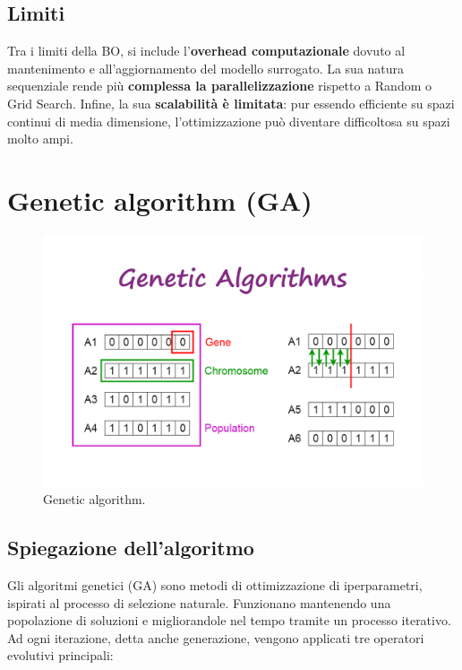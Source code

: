 \documentclass[a4paper,12pt]{report}
\begin{document}
	\subsection{Limiti}
	Tra i limiti della BO, si include l'\textbf{overhead computazionale} dovuto al mantenimento e all'aggiornamento del modello surrogato. La sua natura sequenziale rende più \textbf{complessa la parallelizzazione} rispetto a Random o Grid Search. Infine, la sua \textbf{scalabilità è limitata}: pur essendo efficiente su spazi continui di media dimensione, l'ottimizzazione può diventare difficoltosa su spazi molto ampi.
	
	\section{Genetic algorithm (GA)}
	\begin{figure}[H]
		\centering
		\includegraphics[width=1.0\textwidth]{img/ga.png}
		\caption{Genetic algorithm.}
	\end{figure}
	\subsection{Spiegazione dell'algoritmo}
	Gli algoritmi genetici (GA) sono metodi di ottimizzazione di iperparametri, ispirati al processo di selezione naturale. Funzionano mantenendo una popolazione di soluzioni e migliorandole nel tempo tramite un processo iterativo. Ad ogni iterazione, detta anche generazione, vengono applicati tre operatori evolutivi principali:
	
\end{document}
